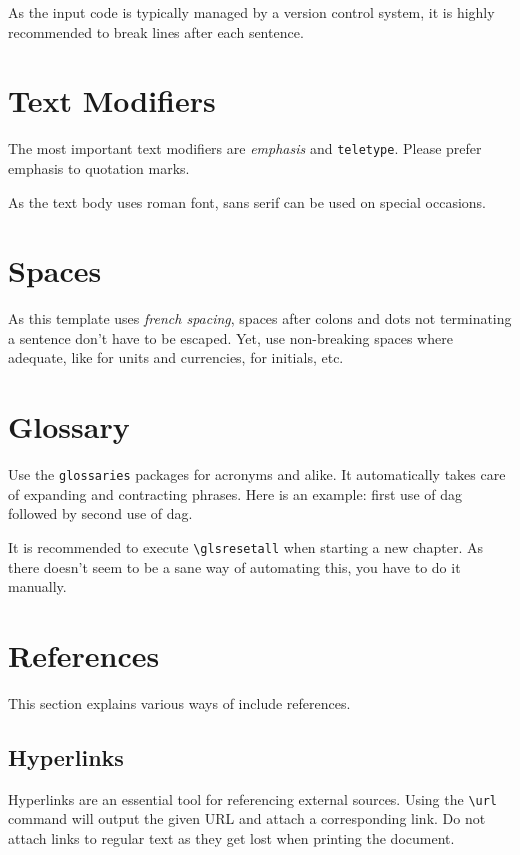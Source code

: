 \documentclass[parskip=half]{scrbook}
\begin{document}
As the input code is typically managed by a version control system, it is highly recommended to break lines after each sentence.

\section{Text Modifiers}

The most important text modifiers are \emph{emphasis} and \texttt{teletype}.
Please prefer emphasis to quotation marks.

As the text body uses roman font, \textsf{sans serif} can be used on special occasions.

\section{Spaces}

As this template uses \emph{french spacing}, spaces after colons and dots not terminating a sentence don't have to be escaped.
Yet, use non-breaking spaces where adequate, like for units and currencies, for initials, etc.

\section{Glossary}

Use the \texttt{glossaries} packages for acronyms and alike.
It automatically takes care of expanding and contracting phrases.
Here is an example: first use of \gls{dag} followed by second use of \gls{dag}.

It is recommended to execute \texttt{\textbackslash{}glsresetall} when starting a new chapter.
As there doesn't seem to be a sane way of automating this, you have to do it manually.

\section{References}

This section explains various ways of include references.

\subsection{Hyperlinks}

Hyperlinks are an essential tool for referencing external sources.
Using the \texttt{\textbackslash{}url} command will output the given URL and attach a corresponding link.
Do not attach links to regular text as they get lost when printing the document.
\end{document}
